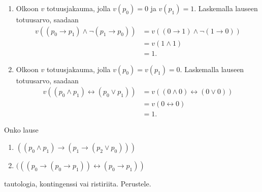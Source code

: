 \documentclass[12pt,a4paper]{article}
\begin{document}
\begin{solution}
\leavevmode\par
\begin{enumerate}[label=\alph*), nosep]
\item Olkoon \(v\) totuusjakauma, jolla \(v(p_0) = 0\) ja \(v(p_1) = 1\).
Laskemalla lauseen totuusarvo, saadaan
\[
\begin{aligned}
  v((p_0 \rightarrow p_1) \land \neg(p_1 \rightarrow p_0)) &=
  v((0 \rightarrow 1) \land \neg(1 \rightarrow 0)) \\
  &= v(1 \land 1) \\
  &= 1.
\end{aligned}
\]

\item Olkoon \(v\) totuusjakauma, jolla \(v(p_0) = v(p_1) = 0\).
Laskemalla lauseen totuusarvo, saadaan
\[
\begin{aligned}
  v((p_0 \land p_1) \leftrightarrow (p_0 \lor p_1)) &=
  v((0 \land 0) \leftrightarrow (0 \lor 0)) \\
  &= v(0 \leftrightarrow 0) \\
  &= 1.
\end{aligned}
\]
\end{enumerate}
\end{solution}

\begin{exercise}
Onko lause
\begin{enumerate}[label=\alph*), nosep]
\item \(((p_0 \land p_1) \rightarrow (p_1 \rightarrow (p_2 \lor p_0)))\)
\item \((((p_0 \rightarrow (p_0 \rightarrow p_1)) \leftrightarrow (p_0
\rightarrow p_1))\)
\end{enumerate}
tautologia, kontingenssi vai ristiriita. Perustele.
\end{exercise}
\end{document}
